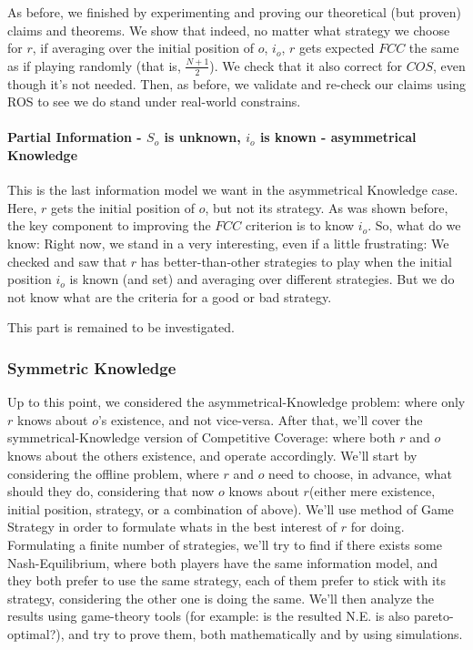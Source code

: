 \documentclass[a4paper,english,10pt]{article}
\newcommand\rob{\ensuremath{r}\xspace}
\newcommand\opp{\ensuremath{o}\xspace}
\newcommand{\fcc}{\ensuremath{FCC}\xspace}
\newcommand{\coos}{\ensuremath{COS}\xspace}
\begin{document}
As before, we finished by experimenting and proving our theoretical (but proven) claims and theorems. We show that indeed, no matter what strategy we choose for \rob, if averaging over the initial position of \opp, $i_\opp$, \rob gets expected \fcc the same as if playing randomly (that is, $\frac{N+1}{2}$).
We check that it also correct for \coos, even though it's not needed.
Then, as before, we validate and re-check our claims using ROS to see we do stand under real-world constrains.

\paragraph{Partial Information - $S_\opp$ is unknown, $i_\opp$ is known - asymmetrical Knowledge} 
This is the last information model we want in the asymmetrical Knowledge case. Here, \rob gets the initial position of \opp, but not its strategy.
As was shown before, the key component to improving the \fcc criterion is to know $i_\opp$. So, what do we know:
Right now, we stand in a very interesting, even if a little frustrating: We checked and saw that \rob has better-than-other strategies to play when the initial position $i_\opp$ is known (and set) and averaging over different strategies. But we do not know what are the criteria for a good or bad strategy.

This part is remained to be investigated. 


\subsubsection{ Symmetric Knowledge}
Up to this point, we considered the asymmetrical-Knowledge problem: where only \rob knows about \opp's existence, and not vice-versa. 
After that, we'll cover the symmetrical-Knowledge version of Competitive Coverage: where both \rob and \opp knows about the others existence, and operate accordingly.
We'll start by considering the offline problem, where \rob and \opp need to choose, in advance, what should they do, considering that now \opp knows about \rob (either mere existence, initial position, strategy, or a combination of above).
We'll use method of Game Strategy in order to formulate whats in the best interest of \rob for doing. Formulating a finite number of strategies, we'll try to find if there exists some Nash-Equilibrium, where both players have the same information model, and they both prefer to use the same strategy, each of them prefer to stick with its strategy, considering the other one is doing the same. We'll then analyze the results using game-theory tools (for example: is the resulted N.E. is also pareto-optimal?), and try to prove them, both mathematically and by using simulations.
\end{document}
